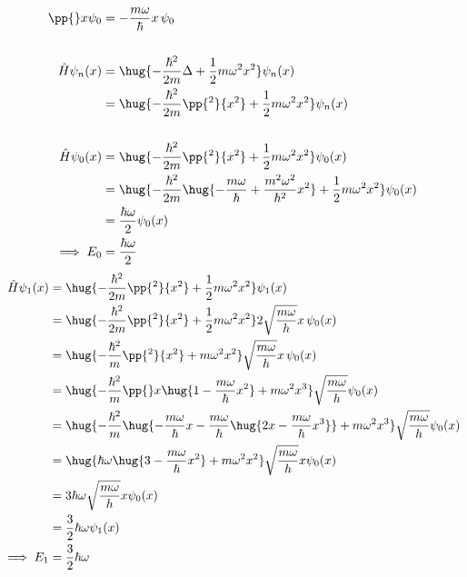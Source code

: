 \documentclass[ex]{exercise}
\begin{document}
\begin{align*}
    \pp{}x \psi_0 &= -\frac{m\omega}{\hbar}x \,\psi_0\\
    \\
    \hat H \psi_n(x) &= \hug{-\frac{\hbar^2}{2m} \Delta+ \frac12 m\omega^2 x^2}\psi_n(x)\\
    &= \hug{-\frac{\hbar^2}{2m} \pp{^2}{x^2}+ \frac12 m\omega^2 x^2}\psi_n(x)\\
    \\
    \hat H \psi_0(x) &= \hug{-\frac{\hbar^2}{2m} \pp{^2}{x^2}+ \frac12 m\omega^2 x^2}\psi_0(x)\\
    &= \hug{-\frac{\hbar^2}{2m} \hug{-\frac{m\omega}{\hbar} + \frac{m^2\omega^2}{\hbar^2}x^2}+ \frac12 m\omega^2 x^2}\psi_0(x)\\
    &= \frac{\hbar \omega }{2}\psi_0(x)\\
    \implies E_0 &= \frac{\hbar \omega }{2}
\end{align*}
\begin{align*}
    \hat H \psi_1(x) &= \hug{-\frac{\hbar^2}{2m} \pp{^2}{x^2}+ \frac12 m\omega^2 x^2}\psi_1(x)\\
    &= \hug{-\frac{\hbar^2}{2m} \pp{^2}{x^2}+ \frac12 m\omega^2 x^2}2\sqrt{\frac{m\omega }{h}}x\,\psi_0(x)\\
    &= \hug{-\frac{\hbar^2}{m} \pp{^2}{x^2}+  m\omega^2 x^2}\sqrt{\frac{m\omega }{h}} x\,\psi_0(x)\\
    &= \hug{-\frac{\hbar^2}{m} \pp{}x \hug{1 - \frac{m\omega}{\hbar}x^2}+  m\omega^2 x^3}\sqrt{\frac{m\omega }{h}} \psi_0(x)\\
    &= \hug{-\frac{\hbar^2}{m} \hug{- \frac{m\omega}{\hbar}x - \frac{m\omega}{\hbar}\hug{2x - \frac{m\omega}{\hbar}x^3}}+  m\omega^2 x^3}\sqrt{\frac{m\omega }{h}} \psi_0(x)\\
    &= \hug{\hbar \omega \hug{3 - \frac{m\omega}{\hbar}x^2}+  m\omega^2 x^2}\sqrt{\frac{m\omega }{h}} x\psi_0(x)\\
    &= 3\hbar \omega\sqrt{\frac{m\omega }{h}} x\psi_0(x)\\
    &= \frac32 \hbar \omega \psi_1(x)\\
    \implies E_1 &= \frac32 \hbar \omega\\
\end{align*}
\end{document}
